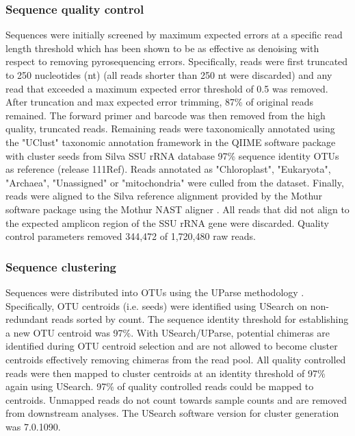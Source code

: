 \documentclass{article}
\begin{document}
\subsubsection{Sequence quality control}
Sequences were initially screened by maximum expected errors at a specific read
length threshold \citep{Edgar_2013} which has been shown to be as effective as
denoising with respect to removing pyrosequencing errors. Specifically, reads
were first truncated to 250 nucleotides (nt) (all reads shorter than 250 nt
were discarded) and any read that exceeded a maximum expected error threshold
of 0.5 was removed. After truncation and max expected error trimming, 87\% of
original reads remained. The forward primer and barcode was then removed from
the high quality, truncated reads.  Remaining reads were taxonomically
annotated using the "UClust" taxonomic annotation framework in the QIIME
software package \citep{Edgar_2010,Caporaso_2010} with cluster seeds from Silva
SSU rRNA database \citep{Pruesse_2007} 97\% sequence identity OTUs as reference
(release 111Ref). Reads annotated as "Chloroplast", "Eukaryota", "Archaea",
"Unassigned" or "mitochondria" were culled from the dataset. Finally, reads
were aligned to the Silva reference alignment provided by the Mothur software
package \citep{Schloss_2009} using the Mothur NAST aligner
\citep{DeSantis_2006}. All reads that did not align to the expected amplicon
region of the SSU rRNA gene were discarded. Quality control parameters removed
344,472 of 1,720,480 raw reads.

\subsubsection{Sequence clustering}
Sequences were distributed into OTUs using the UParse methodology
\citep{Edgar_2013}. Specifically, OTU centroids (i.e. seeds) were identified
using USearch on non-redundant reads sorted by count. The sequence
identity threshold for establishing a new OTU centroid was 97\%. 
With USearch/UParse, potential chimeras are identified during OTU centroid
selection and are not allowed to become cluster centroids effectively removing
chimeras from the read pool. All quality controlled reads were then mapped to
cluster centroids at an identity threshold of 97\% again using USearch. 97\% of
quality controlled reads could be mapped to centroids. Unmapped reads do not
count towards sample counts and are removed from downstream analyses. The
USearch software version for cluster generation was 7.0.1090.
\end{document}
